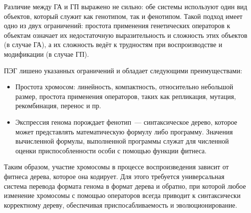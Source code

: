 Различие между ГА и ГП выражено не сильно: обе системы используют один вид объектов, который служит как генотипом, так и фенотипом. Такой подход имеет одно из двух ограничений: простота применения генетических операторов к объектам означает их недостаточную выразительность и сложность этих объектов (в случае ГА), а их сложность ведёт к трудностям при воспроизводстве и модификации (в случае ГП).

ПЭГ лишено указанных ограничений и обладает следующими преимуществами:
\begin{itemize}
  \item Простота хромосом: линейность, компактность, относительно небольшой размер, простота применения операторов, таких как репликация, мутация, рекомбинация, перенос и пр.
  \item Экспрессия генома порождает фенотип~--- синтаксическое дерево, которое может представлять математическую формулу либо программу. Значения вычисленной формулы, выполненной программы служат для численной оценки приспособленности особи с помощью функции фитнеса.
\end{itemize}

Таким образом, участие хромосомы в процессе воспроизведения зависит от фитнеса дерева, которое она кодирует. Для этого требуется универсальная система перевода формата генома в формат дерева и обратно, при которой любое изменение хромосомы с помощью операторов всегда приводит к синтаксически корректному дереву, обеспечивая приспосабливаемость и эволюционирование.
